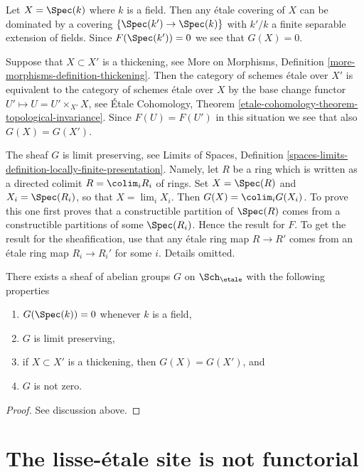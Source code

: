 \medskip\noindent
Let $X = \Spec(k)$ where $k$ is a field.
Then any \'etale covering of $X$ can be dominated
by a covering $\{\Spec(k') \to \Spec(k)\}$ with $k'/k$
a finite separable extension of fields. Since $F(\Spec(k')) = 0$
we see that $G(X) = 0$.

\medskip\noindent
Suppose that $X \subset X'$ is a thickening, see
More on Morphisms, Definition \ref{more-morphisms-definition-thickening}.
Then the category of schemes \'etale over $X'$ is equivalent to the
category of schemes \'etale over $X$ by the base change functor
$U' \mapsto U = U' \times_{X'} X$, see
\'Etale Cohomology,
Theorem \ref{etale-cohomology-theorem-topological-invariance}.
Since $F(U) = F(U')$ in this situation we see that also $G(X) = G(X')$.

\medskip\noindent
The sheaf $G$ is limit preserving, see
Limits of Spaces,
Definition \ref{spaces-limits-definition-locally-finite-presentation}.
Namely, let $R$ be a ring which is written as a directed colimit
$R = \colim_i R_i$ of rings. Set $X = \Spec(R)$ and
$X_i = \Spec(R_i)$, so that $X = \lim_i X_i$. Then
$G(X) = \colim_i G(X_i)$. To prove this one first proves that
a constructible partition of $\Spec(R)$ comes from a constructible
partitions of some $\Spec(R_i)$. Hence the result for $F$. To
get the result for the sheafification, use that any \'etale ring map
$R \to R'$ comes from an \'etale ring map $R_i \to R_i'$ for some $i$.
Details omitted.

\begin{lemma}
\label{lemma-weird-sheaf}
There exists a sheaf of abelian groups $G$ on
$\Sch_\etale$ with the following properties
\begin{enumerate}
\item $G(\Spec(k)) = 0$ whenever $k$ is a field,
\item $G$ is limit preserving,
\item if $X \subset X'$ is a thickening, then $G(X) = G(X')$, and
\item $G$ is not zero.
\end{enumerate}
\end{lemma}

\begin{proof}
See discussion above.
\end{proof}




\section{The lisse-\'etale site is not functorial}
\label{section-lisse-etale-not-functorial}

